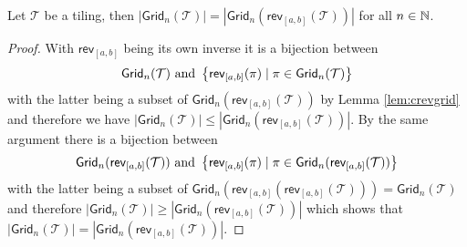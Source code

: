 \begin{proposition}\label{prop:rrtil}
Let $\mathcal{T}$ be a tiling, then $|\textsf{Grid}_n(\mathcal{T})| = |\textsf{Grid}_n(\textsf{rev}_{[a,b]}(\mathcal{T}))|$ for all $n\in\mathbb{N}$.
\end{proposition}
\begin{proof}
With $\textsf{rev}_{[a,b]}$ being its own inverse it is a bijection between
\[
\textsf{Grid}_n(\mathcal{T}) \text{ and } \left\{\textsf{rev}_{[a,b]}(\pi) \mid \pi \in \textsf{Grid}_n(\mathcal{T})\right\}
\]
with the latter being a subset of $\textsf{Grid}_n(\textsf{rev}_{[a,b]}(\mathcal{T}))$ by Lemma \ref{lem:crevgrid} and therefore we have $|\textsf{Grid}_n(\mathcal{T})| \leq |\textsf{Grid}_n(\textsf{rev}_{[a,b]}(\mathcal{T}))|$. By the same argument there is a bijection between
\[
    \textsf{Grid}_n(\textsf{rev}_{[a,b]}(\mathcal{T})) \text{ and } \left\{\textsf{rev}_{[a,b]}(\pi) \mid \pi \in \textsf{Grid}_n(\textsf{rev}_{[a,b]}(\mathcal{T}))\right\}
\]
with the latter being a subset of $\textsf{Grid}_n(\textsf{rev}_{[a,b]}(\textsf{rev}_{[a,b]}(\mathcal{T})))=\textsf{Grid}_n(\mathcal{T})$ and therefore $|\textsf{Grid}_n(\mathcal{T})| \geq |\textsf{Grid}_n(\textsf{rev}_{[a,b]}(\mathcal{T}))|$ which shows that $|\textsf{Grid}_n(\mathcal{T})| = |\textsf{Grid}_n(\textsf{rev}_{[a,b]}(\mathcal{T}))|$.
\end{proof}